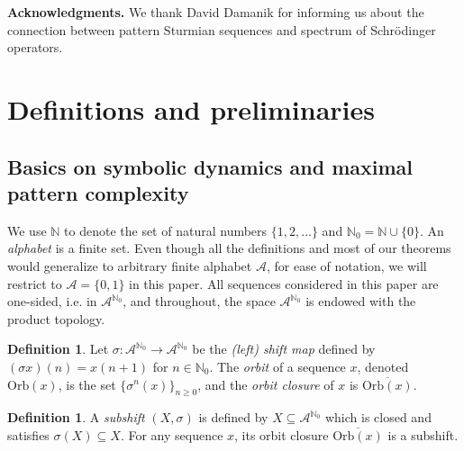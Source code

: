 \documentclass[11pt,reqno]{amsart}
\theoremstyle{definition}
\newtheorem{definition}[theorem]{Definition}
\theoremstyle{plain}
\newcounter{MainTheoremCounter}
\newtheorem{Maintheorem}[MainTheoremCounter]{Theorem}
\newcommand{\A}{\mathcal{A}}
\newcommand{\OO}{\mathrm{Orb}}
\newcommand{\N}{\mathbb{N}}
\begin{document}



\noindent \textbf{Acknowledgments.} We thank David Damanik for informing us about the connection between pattern Sturmian sequences and spectrum of Schr\"{o}dinger operators. 

\section{Definitions and preliminaries}\label{sec:defs}

\subsection{Basics on symbolic dynamics and maximal pattern complexity}


We use $\N$ to denote the set of natural numbers $\{1, 2, \ldots\}$ and $\N_0 = \N \cup \{0\}$. An \emph{alphabet} is a finite set. Even though all the definitions and most of our theorems would generalize to arbitrary finite alphabet $\mathcal{A}$, for ease of notation, we will restrict to $\mathcal{A} = \{0, 1\}$ in this paper.
All sequences considered in this paper are one-sided, i.e. in $\A^{\N_0}$, and throughout, the space $\A^{\N_0}$ is endowed with the product topology. 


\begin{definition}
    Let $\sigma: \A^{\N_0} \to \A^{\N_0}$ be the \emph{(left) shift map} defined by $(\sigma x)(n) = x(n+1)$ for $n \in \N_0$.
    The \emph{orbit} of a sequence $x$, denoted $\OO(x)$, is the set $\{\sigma^n(x)\}_{n \geq 0}$, and the 
    \emph{orbit closure} of $x$ is $\overline{\OO(x)}$.
\end{definition}    

\begin{definition}
     A \emph{subshift} $(X, \sigma)$ is defined by $X \subseteq \A^{\N_0}$ which is closed and satisfies $\sigma(X) \subseteq X$.
     For any sequence $x$, its orbit closure $\overline{\OO(x)}$ is a subshift.
\end{definition}
\end{document}
